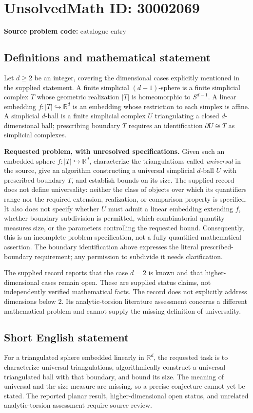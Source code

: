 \documentclass[11pt]{article}
\newcommand{\R}{\mathbb{R}}
\begin{document}
\section*{UnsolvedMath ID: 30002069}
\textbf{Source problem code:} catalogue entry
\subsection{Definitions and mathematical statement}
Let \(d\geq 2\) be an integer, covering the dimensional cases explicitly mentioned in the supplied statement. A finite simplicial \((d-1)\)-sphere is a finite simplicial complex \(T\) whose geometric realization \(|T|\) is homeomorphic to \(S^{d-1}\). A linear embedding \(f:|T|\hookrightarrow\R^d\) is an embedding whose restriction to each simplex is affine. A simplicial \(d\)-ball is a finite simplicial complex \(U\) triangulating a closed \(d\)-dimensional ball; prescribing boundary \(T\) requires an identification \(\partial U\cong T\) as simplicial complexes.

\textbf{Requested problem, with unresolved specifications.} Given such an embedded sphere \(f:|T|\hookrightarrow\R^d\), characterize the triangulations called \emph{universal} in the source, give an algorithm constructing a universal simplicial \(d\)-ball \(U\) with prescribed boundary \(T\), and establish bounds on its size. The supplied record does not define universality: neither the class of objects over which its quantifiers range nor the required extension, realization, or comparison property is specified. It also does not specify whether \(U\) must admit a linear embedding extending \(f\), whether boundary subdivision is permitted, which combinatorial quantity measures size, or the parameters controlling the requested bound. Consequently, this is an incomplete problem specification, not a fully quantified mathematical assertion. The boundary identification above expresses the literal prescribed-boundary requirement; any permission to subdivide it needs clarification.

The supplied record reports that the case \(d=2\) is known and that higher-dimensional cases remain open. These are supplied status claims, not independently verified mathematical facts. The record does not explicitly address dimensions below \(2\). Its analytic-torsion literature assessment concerns a different mathematical problem and cannot supply the missing definition of universality.
\subsection{Short English statement}
For a triangulated sphere embedded linearly in \(\R^d\), the requested task is to characterize universal triangulations, algorithmically construct a universal triangulated ball with that boundary, and bound its size. The meaning of universal and the size measure are missing, so a precise conjecture cannot yet be stated. The reported planar result, higher-dimensional open status, and unrelated analytic-torsion assessment require source review.
\end{document}
